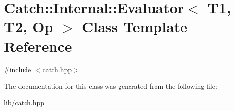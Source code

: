 \hypertarget{class_catch_1_1_internal_1_1_evaluator}{}\section{Catch\+:\+:Internal\+:\+:Evaluator$<$ T1, T2, Op $>$ Class Template Reference}
\label{class_catch_1_1_internal_1_1_evaluator}


{\ttfamily \#include $<$catch.\+hpp$>$}



The documentation for this class was generated from the following file\+:\begin{DoxyCompactItemize}
\item 
lib/\hyperlink{catch_8hpp}{catch.\+hpp}\end{DoxyCompactItemize}
